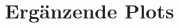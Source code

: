\documentclass[11pt,a4paper,oneside]{scrartcl}
\begin{document}
\newpage

 

\appendix


\section{Ergänzende Plots}
\end{document}
